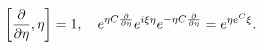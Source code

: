 \begin{equation}
\left[ {\frac{\partial }{\partial \eta }},\eta \right] =1,\quad e^{\eta C{%
\frac{\partial }{\partial \eta }}}e^{i\xi \eta }e^{-\eta C{\frac{\partial }{%
\partial \eta }}}=e^{\eta e^{C}\xi }.
\end{equation}

